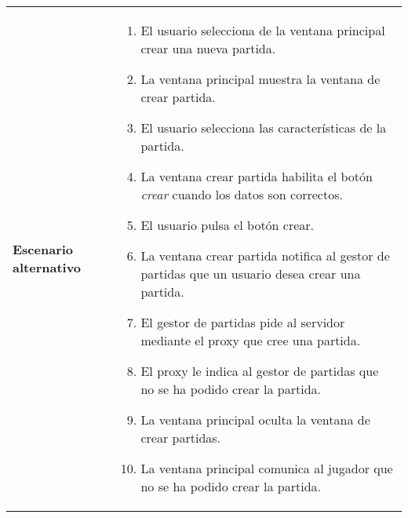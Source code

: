 {\begin{tabularx}{0.95\textwidth}{p{}|X}
\textbf{Escenario alternativo} & \begin{enumerate}
\item El usuario selecciona de la ventana principal crear una nueva partida.
\item La ventana principal muestra la ventana de crear partida.
\item El usuario selecciona las características de la partida.
\item La ventana crear partida habilita el botón \emph{crear} cuando los datos
son correctos.
\item El usuario pulsa el botón crear.
\item La ventana crear partida notifica al gestor de partidas que un usuario
desea crear una partida.
\item El gestor de partidas pide al servidor mediante el proxy que cree una
partida.
\item El proxy le indica al gestor de partidas que no se ha podido crear la
partida.
\item La ventana principal oculta la ventana de crear partidas.
\item La ventana principal comunica al jugador que no se ha podido crear la
partida.
\end{enumerate} \\

\end{tabularx}
}


